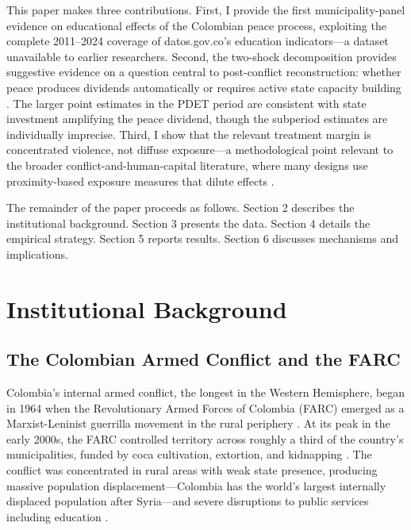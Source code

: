 \documentclass[12pt]{article}
\begin{document}
This paper makes three contributions. First, I provide the first municipality-panel evidence on educational effects of the Colombian peace process, exploiting the complete 2011--2024 coverage of datos.gov.co's education indicators---a dataset unavailable to earlier researchers. Second, the two-shock decomposition provides suggestive evidence on a question central to post-conflict reconstruction: whether peace produces dividends automatically or requires active state capacity building \citep{acemoglu2013state, collier2003breaking}. The larger point estimates in the PDET period are consistent with state investment amplifying the peace dividend, though the subperiod estimates are individually imprecise. Third, I show that the relevant treatment margin is concentrated violence, not diffuse exposure---a methodological point relevant to the broader conflict-and-human-capital literature, where many designs use proximity-based exposure measures that dilute effects \citep{blattman2010consequences}.

The remainder of the paper proceeds as follows. Section 2 describes the institutional background. Section 3 presents the data. Section 4 details the empirical strategy. Section 5 reports results. Section 6 discusses mechanisms and implications.


\section{Institutional Background}

\subsection{The Colombian Armed Conflict and the FARC}

Colombia's internal armed conflict, the longest in the Western Hemisphere, began in 1964 when the Revolutionary Armed Forces of Colombia (FARC) emerged as a Marxist-Leninist guerrilla movement in the rural periphery \citep{fergusson2020conflict}. At its peak in the early 2000s, the FARC controlled territory across roughly a third of the country's municipalities, funded by coca cultivation, extortion, and kidnapping \citep{dube2013crossborder}. The conflict was concentrated in rural areas with weak state presence, producing massive population displacement---Colombia has the world's largest internally displaced population after Syria---and severe disruptions to public services including education \citep{rodriguez2010colombian, ibanezmori2006displacement}.
\end{document}
